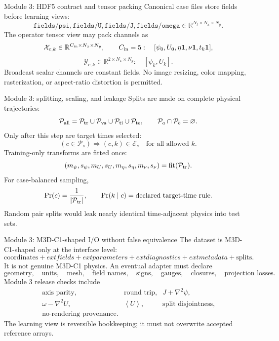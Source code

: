 \documentclass[aspectratio=169,11pt]{beamer}
\newcommand{\avg}[1]{\left\langle #1\right\rangle}
\newcommand{\code}[1]{\texttt{#1}}
\newcommand{\currentmodule}{Module 1}
\newcommand{\moduleprogress}{1 of 4}
\newcommand{\setmodule}[2]{%
  \renewcommand{\currentmodule}{#1}%
  \renewcommand{\moduleprogress}{#2}%
}
\begin{document}
\setmodule{Module 3}{2 of 4}
\begin{frame}[t]{Module 3: HDF5 contract and tensor packing}
\vspace{-0.15em}
Canonical case files store fields before learning views:
\[
\code{fields/psi},\code{fields/U},\code{fields/J},\code{fields/omega}
\in\mathbb R^{N_t\times N_x\times N_y}.
\]
The operator tensor view may pack channels as
\[
\mathcal X_{c,k}\in\mathbb R^{C_{\rm in}\times N_x\times N_y},
\qquad
C_{\rm in}=5:
\quad
[\psi_0,U_0,\eta\mathbf 1,\nu\mathbf 1,t_k\mathbf 1],
\]
\[
\mathcal Y_{c,k}\in\mathbb R^{2\times N_x\times N_y}:
\quad
[\psi_k,U_k].
\]
Broadcast scalar channels are constant fields. No image resizing, color mapping, rasterization, or aspect-ratio distortion is permitted.
\end{frame}

\setmodule{Module 3}{3 of 4}
\begin{frame}[t]{Module 3: splitting, scaling, and leakage}
\vspace{-0.15em}
Splits are made on complete physical trajectories:
\[
\mathcal P_{\rm all}=\mathcal P_{\rm tr}\cup\mathcal P_{\rm va}\cup\mathcal P_{\rm ti}\cup\mathcal P_{\rm te},
\qquad
\mathcal P_a\cap\mathcal P_b=\varnothing.
\]
Only after this step are target times selected:
\[
(c\in\mathcal P_s)\Rightarrow (c,k)\in\mathcal E_s
\quad\text{for all allowed }k.
\]
Training-only transforms are fitted once:
\[
(m_\psi,s_\psi,m_U,s_U,m_\eta,s_\eta,m_\nu,s_\nu)=\operatorname{fit}(\mathcal P_{\rm tr}).
\]
For case-balanced sampling,
\[
\Pr(c)=\frac{1}{|\mathcal P_{\rm tr}|},
\qquad
\Pr(k\mid c)=\text{declared target-time rule}.
\]
Random pair splits would leak nearly identical time-adjacent physics into test sets.
\end{frame}

\setmodule{Module 3}{4 of 4}
\begin{frame}[t]{Module 3: M3D-C1-shaped I/O without false equivalence}
\vspace{-0.15em}
The dataset is M3D-C1-shaped only at the interface level:
\[
\text{coordinates}+	ext{fields}+	ext{parameters}+	ext{diagnostics}+	ext{metadata}+\text{splits}.
\]
It is not genuine M3D-C1 physics. An eventual adapter must declare
\[
\text{geometry},\quad \text{units},\quad \text{mesh},\quad \text{field names},\quad
\text{signs},\quad \text{gauges},\quad \text{closures},\quad \text{projection losses}.
\]
Module 3 release checks include
\[
\begin{array}{lll}
\text{axis parity}, & \text{round trip}, & J+\nabla^2\psi,\\
\omega-\nabla^2U, & \avg U, & \text{split disjointness},\\
\text{no-rendering provenance}. & &
\end{array}
\]
The learning view is reversible bookkeeping; it must not overwrite accepted reference arrays.
\end{frame}
\end{document}
